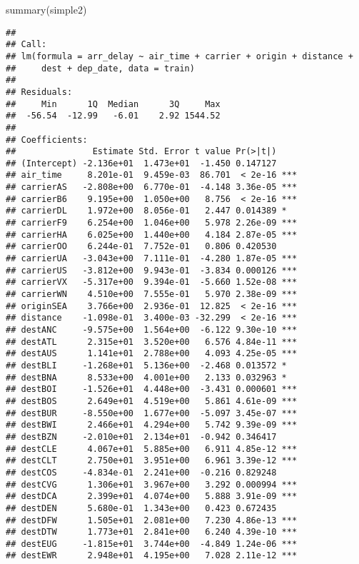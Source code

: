 \documentclass[
]{article}
\newenvironment{Shaded}{\begin{snugshade}}{\end{snugshade}}
\newcommand{\FunctionTok}[1]{\textcolor[rgb]{0.00,0.00,0.00}{#1}}
\newcommand{\NormalTok}[1]{#1}
\begin{document}
\begin{Shaded}
\begin{Highlighting}[]
\FunctionTok{summary}\NormalTok{(simple2)}
\end{Highlighting}
\end{Shaded}

\begin{verbatim}
## 
## Call:
## lm(formula = arr_delay ~ air_time + carrier + origin + distance + 
##     dest + dep_date, data = train)
## 
## Residuals:
##     Min      1Q  Median      3Q     Max 
##  -56.54  -12.99   -6.01    2.92 1544.52 
## 
## Coefficients:
##               Estimate Std. Error t value Pr(>|t|)    
## (Intercept) -2.136e+01  1.473e+01  -1.450 0.147127    
## air_time     8.201e-01  9.459e-03  86.701  < 2e-16 ***
## carrierAS   -2.808e+00  6.770e-01  -4.148 3.36e-05 ***
## carrierB6    9.195e+00  1.050e+00   8.756  < 2e-16 ***
## carrierDL    1.972e+00  8.056e-01   2.447 0.014389 *  
## carrierF9    6.254e+00  1.046e+00   5.978 2.26e-09 ***
## carrierHA    6.025e+00  1.440e+00   4.184 2.87e-05 ***
## carrierOO    6.244e-01  7.752e-01   0.806 0.420530    
## carrierUA   -3.043e+00  7.111e-01  -4.280 1.87e-05 ***
## carrierUS   -3.812e+00  9.943e-01  -3.834 0.000126 ***
## carrierVX   -5.317e+00  9.394e-01  -5.660 1.52e-08 ***
## carrierWN    4.510e+00  7.555e-01   5.970 2.38e-09 ***
## originSEA    3.766e+00  2.936e-01  12.825  < 2e-16 ***
## distance    -1.098e-01  3.400e-03 -32.299  < 2e-16 ***
## destANC     -9.575e+00  1.564e+00  -6.122 9.30e-10 ***
## destATL      2.315e+01  3.520e+00   6.576 4.84e-11 ***
## destAUS      1.141e+01  2.788e+00   4.093 4.25e-05 ***
## destBLI     -1.268e+01  5.136e+00  -2.468 0.013572 *  
## destBNA      8.533e+00  4.001e+00   2.133 0.032963 *  
## destBOI     -1.526e+01  4.448e+00  -3.431 0.000601 ***
## destBOS      2.649e+01  4.519e+00   5.861 4.61e-09 ***
## destBUR     -8.550e+00  1.677e+00  -5.097 3.45e-07 ***
## destBWI      2.466e+01  4.294e+00   5.742 9.39e-09 ***
## destBZN     -2.010e+01  2.134e+01  -0.942 0.346417    
## destCLE      4.067e+01  5.885e+00   6.911 4.85e-12 ***
## destCLT      2.750e+01  3.951e+00   6.961 3.39e-12 ***
## destCOS     -4.834e-01  2.241e+00  -0.216 0.829248    
## destCVG      1.306e+01  3.967e+00   3.292 0.000994 ***
## destDCA      2.399e+01  4.074e+00   5.888 3.91e-09 ***
## destDEN      5.680e-01  1.343e+00   0.423 0.672435    
## destDFW      1.505e+01  2.081e+00   7.230 4.86e-13 ***
## destDTW      1.773e+01  2.841e+00   6.240 4.39e-10 ***
## destEUG     -1.815e+01  3.744e+00  -4.849 1.24e-06 ***
## destEWR      2.948e+01  4.195e+00   7.028 2.11e-12 ***

\end{verbatim}
\end{document}
